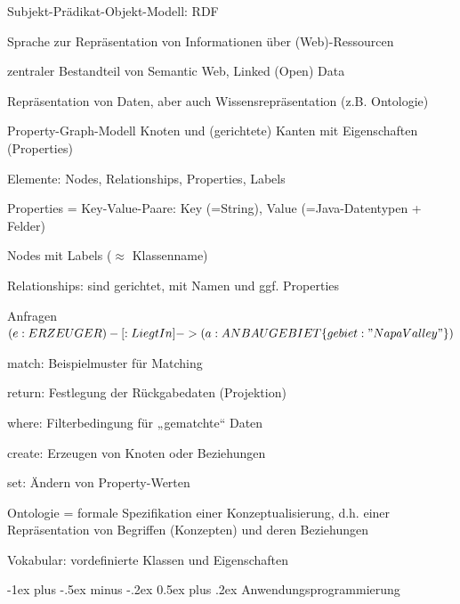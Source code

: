 \documentclass[a4paper]{article}
\makeatletter
\renewcommand{\section}{\@startsection{section}{1}{0mm}%
                                {-1ex plus -.5ex minus -.2ex}%
                                {0.5ex plus .2ex}%
                                {\normalfont\large\bfseries}}
\makeatother
\begin{document}
\begin{multicols}{3}
\begin{description*}
\begin{description*}
        \end{description*}
        \item[Subjekt-Prädikat-Objekt-Modell: RDF]
        \begin{itemize*}
            \item Sprache zur Repräsentation von Informationen über (Web)-Ressourcen
            \item zentraler Bestandteil von Semantic Web, Linked (Open) Data
            \item Repräsentation von Daten, aber auch Wissensrepräsentation (z.B. Ontologie)
        \end{itemize*}
        \item[Property-Graph-Modell] Knoten und (gerichtete) Kanten mit Eigenschaften (Properties)
        \begin{itemize*}
            \item Elemente: Nodes, Relationships, Properties, Labels
            \item Properties = Key-Value-Paare: Key (=String), Value (=Java-Datentypen + Felder)
            \item Nodes mit Labels ($\approx$ Klassenname)
            \item Relationships: sind gerichtet, mit Namen und ggf. Properties
            \item Anfragen  $(e:ERZEUGER)-[:LiegtIn]->(a:ANBAUGEBIET \{gebiet: "Napa Valley"\} )$
            \item match: Beispielmuster für Matching
            \item return: Festlegung der Rückgabedaten (Projektion)
            \item where: Filterbedingung für „gematchte“ Daten
            \item create: Erzeugen von Knoten oder Beziehungen
            \item set: Ändern von Property-Werten
        \end{itemize*}
    \end{description*}

    Ontologie = formale Spezifikation einer Konzeptualisierung, d.h. einer Repräsentation von Begriffen (Konzepten) und deren Beziehungen

    Vokabular: vordefinierte Klassen und Eigenschaften

    \section{Anwendungsprogrammierung}


\end{multicols}
\end{document}
